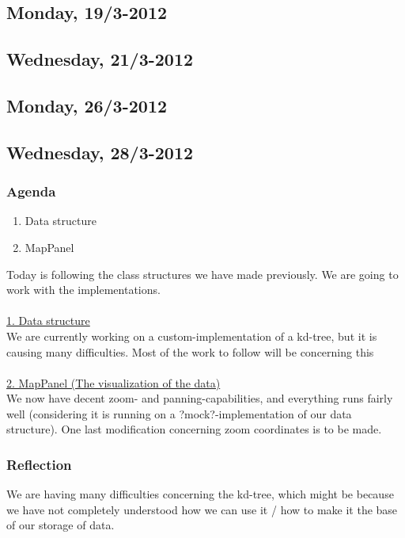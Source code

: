 \documentclass[a4paper,11pt]{article}
\begin{document}
\subsection{Monday, 19/3-2012}


\pagebreak
\subsection{Wednesday, 21/3-2012}


\pagebreak
\subsection{Monday, 26/3-2012}


\pagebreak
\subsection{Wednesday, 28/3-2012}

\subsubsection*{Agenda}
\begin{enumerate}
	\item Data structure
	\item MapPanel
\end{enumerate}
Today is following the class structures we have made previously. We are going to work with the implementations. \\ \\
\underline{1. Data structure} \\
We are currently working on a custom-implementation of a kd-tree, but it is causing many difficulties. Most of the work to follow will be concerning this \\ \\
\underline{2. MapPanel (The visualization of the data)} \\
We now have decent zoom- and panning-capabilities, and everything runs fairly well (considering it is running on a ?mock?-implementation of our data structure). One last modification concerning zoom coordinates is to be made.

\subsubsection*{Reflection}
We are having many difficulties concerning the kd-tree, which might be because we have not completely understood how we can use it / how to make it the base of our storage of data.
\end{document}
